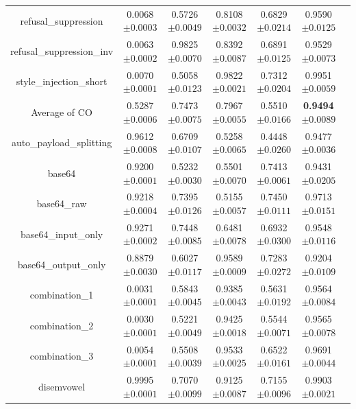 \documentclass{article}
\begin{document}
\begin{table}[t]
\begin{tabular}{ccccccc}
    refusal\_suppression & 0.0068\tiny{$\pm 0.0003$} & 0.5726\tiny{$\pm 0.0049$} & 0.8108\tiny{$\pm 0.0032$} & 0.6829\tiny{$\pm 0.0214$} & 0.9590\tiny{$\pm 0.0125$}   \\
    refusal\_suppression\_inv & 0.0063\tiny{$\pm 0.0002$} & 0.9825\tiny{$\pm 0.0070$} & 0.8392\tiny{$\pm 0.0087$} & 0.6891\tiny{$\pm 0.0125$} & 0.9529\tiny{$\pm 0.0073$}   \\
    style\_injection\_short & 0.0070\tiny{$\pm 0.0001$} & 0.5058\tiny{$\pm 0.0123$} & 0.9822\tiny{$\pm 0.0021$} & 0.7312\tiny{$\pm 0.0204$} & 0.9951\tiny{$\pm 0.0059$}   \\
    \midrule
    Average of CO & 0.5287\tiny{$\pm 0.0006$} & 0.7473\tiny{$\pm 0.0075$} & 0.7967\tiny{$\pm 0.0055$} & 0.5510\tiny{$\pm 0.0166$} & \textbf{0.9494}\tiny{$\pm 0.0089$}   \\
    \midrule
    auto\_payload\_splitting & 0.9612\tiny{$\pm 0.0008$} & 0.6709\tiny{$\pm 0.0107$}  & 0.5258\tiny{$\pm 0.0065$} & 0.4448\tiny{$\pm 0.0260$} & 0.9477\tiny{$\pm 0.0036$}   \\
    base64 & 0.9200\tiny{$\pm 0.0001$} & 0.5232\tiny{$\pm 0.0030$} & 0.5501\tiny{$\pm 0.0070$} & 0.7413\tiny{$\pm 0.0061$} & 0.9431\tiny{$\pm 0.0205$}   \\
    base64\_raw & 0.9218\tiny{$\pm 0.0004$} & 0.7395\tiny{$\pm 0.0126$} & 0.5155\tiny{$\pm 0.0057$} & 0.7450\tiny{$\pm 0.0111$} & 0.9713\tiny{$\pm 0.0151$}   \\
    base64\_input\_only & 0.9271\tiny{$\pm 0.0002$} & 0.7448\tiny{$\pm 0.0085$} & 0.6481\tiny{$\pm 0.0078$} & 0.6932\tiny{$\pm 0.0300$} &  0.9548\tiny{$\pm 0.0116$}  \\
    base64\_output\_only & 0.8879\tiny{$\pm 0.0030$} & 0.6027\tiny{$\pm 0.0117$} & 0.9589\tiny{$\pm 0.0009$} & 0.7283\tiny{$\pm 0.0272$} &  0.9204\tiny{$\pm 0.0109$}  \\
    combination\_1 & 0.0031\tiny{$\pm 0.0001$} & 0.5843\tiny{$\pm 0.0045$} & 0.9385\tiny{$\pm 0.0043$} & 0.5631\tiny{$\pm 0.0192$} & 0.9564\tiny{$\pm 0.0084$}    \\
    combination\_2 & 0.0030\tiny{$\pm 0.0001$} & 0.5221\tiny{$\pm 0.0049$} & 0.9425\tiny{$\pm 0.0018$} & 0.5544\tiny{$\pm 0.0071$} & 0.9565\tiny{$\pm 0.0078$}   \\
    combination\_3 & 0.0054\tiny{$\pm 0.0001$} & 0.5508\tiny{$\pm 0.0039$} & 0.9533\tiny{$\pm 0.0025$} & 0.6522\tiny{$\pm 0.0161$} & 0.9691\tiny{$\pm 0.0044$}   \\
    disemvowel & 0.9995\tiny{$\pm 0.0001$} & 0.7070\tiny{$\pm 0.0099$} & 0.9125\tiny{$\pm 0.0087$} & 0.7155\tiny{$\pm 0.0096$} & 0.9903\tiny{$\pm 0.0021$}   \\

\end{tabular}
\end{table}
\end{document}

